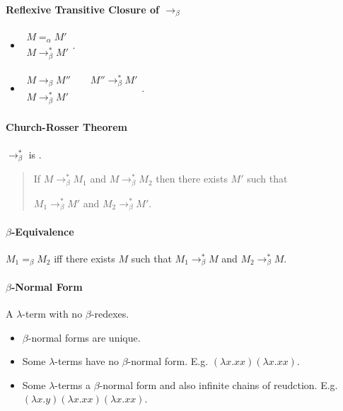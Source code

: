 \documentclass[twocolumn,english]{article}
\let\emph\relax
\begin{document}
\paragraph{Reflexive Transitive Closure of $\rightarrow_{\beta}$}
\begin{itemize}
\item $\begin{array}{c}
M=_{\alpha}M'\\
\hline M\rightarrow_{\beta}^{*}M'
\end{array}$. 
\item $\begin{array}{c}
M\rightarrow_{\beta}M''\qquad M''\rightarrow_{\beta}^{*}M'\\
\hline M\rightarrow_{\beta}^{*}M'
\end{array}$. 
\end{itemize}

\paragraph{Church-Rosser Theorem}

$\rightarrow_{\beta}^{*}$ is \emph{confluent}. 
\begin{quotation}
If $M\rightarrow_{\beta}^{*}M_{1}$ and $M\rightarrow_{\beta}^{*}M_{2}$
then there exists $M'$ such that

$M_{1}\rightarrow_{\beta}^{*}M'$ and $M_{2}\rightarrow_{\beta}^{*}M'$. 
\end{quotation}

\paragraph{$\beta$-Equivalence}

$M_{1}=_{\beta}M_{2}$ iff there exists $M$ such that $M_{1}\rightarrow_{\beta}^{*}M$
and $M_{2}\rightarrow_{\beta}^{*}M$.


\paragraph{$\beta$-Normal Form}

A $\lambda$-term with no $\beta$-redexes. 
\begin{itemize}
\item $\beta$-normal forms are unique. 
\item Some $\lambda$-terms have no $\beta$-normal form. E.g. $\left(\lambda x.xx\right)\left(\lambda x.xx\right)$. 
\item Some $\lambda$-terms a $\beta$-normal form and also infinite chains
of reudction. E.g. $\left(\lambda x.y\right)\left(\lambda x.xx\right)\left(\lambda x.xx\right)$. 
\end{itemize}
\end{document}
